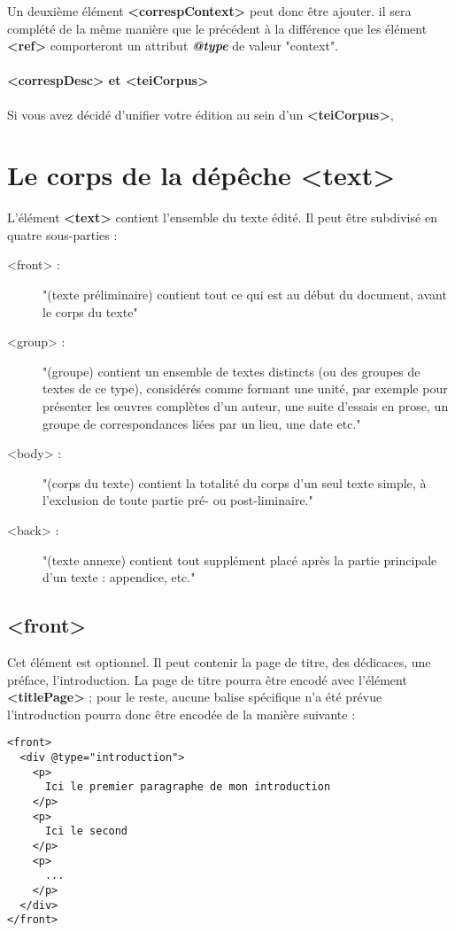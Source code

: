 \documentclass[18pt,a4paper,oneside]{book} %
\begin{document}
Un deuxième élément \textbf{<correspContext>} peut donc être ajouter. il sera complété de la même manière que le précédent à la différence que les élément \textbf{<ref>} comporteront un attribut \textbf{\textit{@type}} de valeur "context".

\subsubsection{<correspDesc> et <teiCorpus>}

Si vous avez décidé d'unifier votre édition au sein d'un \textbf{<teiCorpus>}, 

\chapter{Le corps de la dépêche <text>}

L'élément \textbf{<text>} contient l'ensemble du texte édité. Il peut être subdivisé en quatre sous-parties : 

\begin{description}
\item [<front> : ] "(texte préliminaire) contient tout ce qui est au début du document, avant le corps du texte"
\item [<group> : ] "(groupe) contient un ensemble de textes distincts (ou des groupes de textes de ce type), considérés comme formant une unité, par exemple pour présenter les œuvres complètes d'un auteur, une suite d'essais en prose, un groupe de correspondances liées par un lieu, une date etc."
\item [<body> : ] "(corps du texte) contient la totalité du corps d'un seul texte simple, à l'exclusion de toute partie pré- ou post-liminaire."
\item [<back> : ] "(texte annexe) contient tout supplément placé après la partie principale d'un texte : appendice, etc."
\end{description}

\section{<front>}

Cet élément est optionnel. Il peut contenir la page de titre, des dédicaces, une préface, l'introduction.
La page de titre pourra être encodé avec l'élément \textbf{<titlePage>} ; pour le reste, aucune balise spécifique n'a été prévue l'introduction pourra donc être encodée de la manière suivante : 
\begin{lstlisting}
<front>
  <div @type="introduction">
  	<p>
  	  Ici le premier paragraphe de mon introduction
  	</p>
  	<p>
  	  Ici le second
  	</p>
  	<p>
  	  ...  	
  	</p>
  </div>
</front>
\end{lstlisting}
\end{document}
